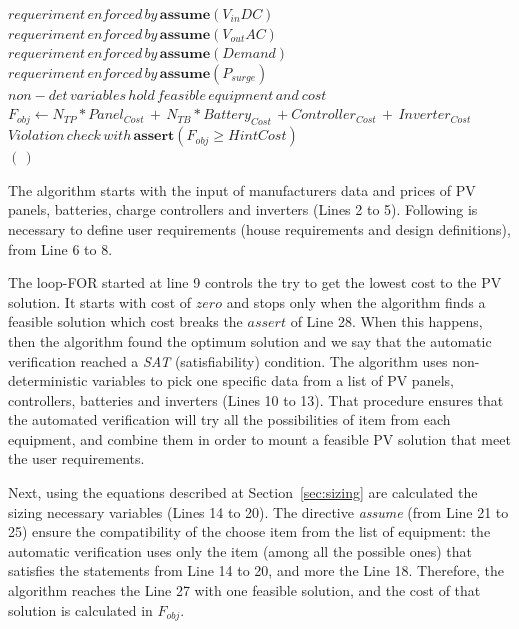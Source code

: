 \documentclass[10pt,conference]{IEEEtran}
\begin{document}
\begin{algorithm}
\begin{algorithmic}[1]
\begin{scriptsize}
	\STATE $requeriment \, enforced \, by \, \textbf{assume}(V_{in}DC)$ \\
	\STATE $requeriment \, enforced \, by \, \textbf{assume}(V_{out}AC)$ \\
	\STATE $requeriment \, enforced \, by \, \textbf{assume}(Demand)$ \\
	\STATE $requeriment \, enforced \, by \, \textbf{assume}(P_{surge})$ \\
	\STATE $non-det \, variables \, hold \, feasible \, equipment \, and \ cost $ \\
	\STATE $F_{obj} \leftarrow  N_{TP}*Panel_{Cost} \, + \, N_{TB}*Battery_{Cost} \, + Controller_{Cost} \, + \, Inverter_{Cost}$ \\
	\STATE $Violation \, check \, with \, \textbf{assert}(F_{obj} \geq HintCost)$ \\
  \ENDFOR
 \RETURN $(\,)$ 
  \end{scriptsize}
 \end{algorithmic} 
 \label{alg:verification-algorithm}
 \end{algorithm}
 
The algorithm starts with the input of manufacturers data and prices of PV panels, batteries, charge controllers and inverters (Lines 2 to 5). Following is necessary to define user requirements (house requirements and design definitions), from Line 6 to 8. 

The loop-FOR started at line 9 controls the try to get the lowest cost to the PV solution. It starts with cost of $zero$ and stops only when the algorithm finds a feasible solution which cost breaks the $assert$ of Line 28. When this happens, then the algorithm found the optimum solution and we say that the automatic verification reached a \textit{SAT} (satisfiability) condition. The algorithm uses non-deterministic variables to pick one specific data from a list of PV panels, controllers, batteries and inverters (Lines 10 to 13). That procedure ensures that the automated verification will try all the possibilities of item from each equipment, and combine them in order to mount a feasible PV solution that meet the user requirements.

Next, using the equations described at Section~\ref{sec:sizing} are calculated the sizing necessary variables (Lines 14 to 20). The directive \textit{assume} (from Line 21 to 25) ensure the compatibility of the choose item from the list of equipment: the automatic verification uses only the item (among all the possible ones) that satisfies the statements from Line 14 to 20, and more the Line 18. Therefore, the algorithm reaches the Line 27 with one feasible solution, and the cost of that solution is calculated in $F_{obj}$.
\end{document}
